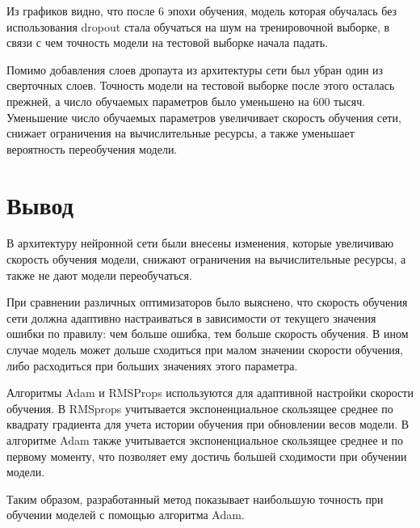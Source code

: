 Из графиков видно, что после 6 эпохи обучения, модель которая обучалась без использования dropout стала обучаться на шум на тренировочной выборке, в связи с чем точность модели на тестовой выборке начала падать.

Помимо добавления слоев дропаута из архитектуры сети был убран один из сверточных слоев. Точность модели на тестовой выборке после этого осталась прежней, а число обучаемых параметров было уменьшено на 600 тысяч. Уменьшение число обучаемых параметров увеличивает скорость обучения сети, снижает ограничения на вычислительные ресурсы, а также уменьшает вероятность переобучения модели.

\section{Вывод}
В архитектуру нейронной сети были внесены изменения, которые увеличиваю скорость обучения модели, снижают ограничения на вычислительные ресурсы, а также не дают модели переобучаться.

При сравнении различных оптимизаторов было выяснено, что скорость обучения сети должна адаптивно настраиваться в зависимости от текущего значения ошибки по правилу: чем больше ошибка, тем больше скорость обучения. В ином случае модель может дольше сходиться при малом значении скорости обучения, либо расходиться при больших значениях этого параметра.

Алгоритмы Adam и RMSProps используются для адаптивной настройки скорости обучения. В RMSprops учитывается экспоненциальное скользящее среднее по квадрату градиента для учета истории обучения при обновлении весов модели. В алгоритме Adam также учитывается экспоненциальное скользящее среднее и по первому моменту, что позволяет ему достичь большей сходимости при обучении модели.

Таким образом, разработанный метод показывает наибольшую точность при обучении моделей с помощью алгоритма Adam.
